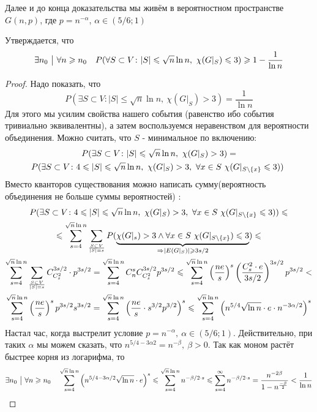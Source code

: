 \begin{note}
	Далее и до конца доказательства мы живём в вероятностном пространстве $G(n, p)$, где $p = n^{-\alpha}$, $\alpha \in (5/6; 1)$
\end{note}

\begin{lemma}
	Утверждается, что
	\[
		\exists n_0 \ \big|\  \forall n \geqslant n_0 \quad P(\forall S \subset V \colon |S| \leqslant \sqrt{n}\ln n,\ \chi(G|_S) \leqslant 3) \geqslant 1 - \frac{1}{\ln n}
	\]
\end{lemma}


\begin{proof}
	Надо показать, что
	\[
		P(\exists S \subset V \colon |S| \le \sqrt{n}\ln n,\ \chi(G|_S) > 3) = \frac{1}{\ln n}
	\]
	Для этого мы усилим свойства нашего события (равенство ибо события тривиально эквивалентны), а затем воспользуемся неравенством для вероятности объединения.
    Можно считать, что $S$ - минимальное по включению:
	\begin{multline*}
		P(\exists S \subset V \colon |S| \le \sqrt{n}\ln n,\ \chi(G|_S) > 3) =
		\\ 
		P(\exists S \subset V \colon 4 \le |S| \le \sqrt{n}\ln n,\ \chi(G|_S) > 3,\ \forall x \in S\ \chi(G|_{S \bs \{x\}} \leq 3)) \
    \end{multline*}
    Вместо кванторов существования можно написать сумму(вероятность объединения не больше суммы вероятностей)  :
    \begin{multline*}
		P(\exists S \subset V \colon 4 \le |S| \le \sqrt{n}\ln n,\ \chi(G|_S) > 3,\ \forall x \in S\ \chi(G|_{S \bs \{x\}} \leq 3)) \le\\
		\le \sum_{s = 4}^{\sqrt{n}\ln n} \sum_{S \subset V \over |S| = s} P(\underbrace{\chi(G|_s) > 3 \wedge \forall x \in S\ \chi(G|_{S \bs \{x\}}) \le 3}_{\Ra |E(G|_S)| \ge 3s/2}) \le
		\\
		\sum_{s = 4}^{\sqrt{n}\ln n}\sum_{S \subset V \over |S| = s} C_{C_s^2}^{3s / 2} \cdot p^{3s / 2} = \sum_{s = 4}^{\sqrt{n}\ln n} C_n^s C_{C_s^2}^{3s / 2} p^{3s / 2} \le \sum_{s = 4}^{\sqrt{n}\ln n} \ps{\frac{ne}{s}}^s \ps{\frac{C_s^2 \cdot e}{3s / 2}}^{3s / 2} p^{3s / 2} <
		\\
		\sum_{s = 4}^{\sqrt{n}\ln n} \ps{\frac{ne}{s}}^s p^{3s / 2} s^{3s / 2} = \sum_{s = 4}^{\sqrt{n}\ln n} \ps{\frac{ne}{s} \cdot s^{3 / 2} p^{3 / 2}}^s \le \sum_{s = 4}^{\sqrt{n}\ln n} \ps{n^{5 / 4}\sqrt{\ln n} \cdot e \cdot n^{-3\alpha / 2}}^s
	\end{multline*}
	Настал час, когда выстрелит условие $p = n^{-\alpha},\ \alpha \in (5 / 6; 1)$. Действительно, при таких $\alpha$ мы можем сказать, что $n^{5 / 4 - 3\alpha 2} = n^{-\beta},\ \beta > 0$. Так как моном растёт быстрее корня из логарифма, то
	\[
		\exists n_0 \ \big|\  \forall n \geqslant n_0 \quad \sum_{s = 4}^{\sqrt{n}\ln n} \left(n^{5 / 4 - 3\alpha / 2}\sqrt{\ln n} \cdot e\right)^s \leqslant \sum_{s = 4}^{\sqrt{n}\ln n} n^{-\beta / 2 \cdot s}
        \leqslant \sum_{s = 4}^{\infty} n^{-\beta / 2 \cdot s} = \frac{n^{-2\beta}}{1-n^{\frac{-\beta}{2}}} < \frac{1}{\ln{n}}
	\]
\end{proof}

